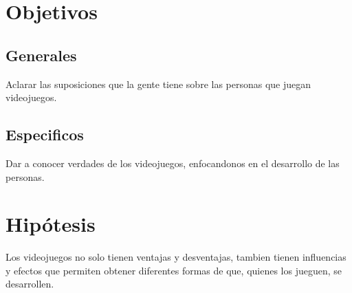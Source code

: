 \documentclass{bmcart}
\begin{document}
\section*{Objetivos}
\subsection*{Generales}
Aclarar las suposiciones que la gente tiene sobre las personas que juegan videojuegos.
\subsection*{Especificos}
Dar a conocer verdades de los videojuegos, enfocandonos en el desarrollo de las personas.

\section*{Hipótesis}
Los videojuegos no solo tienen ventajas y desventajas, tambien tienen influencias y efectos que permiten obtener diferentes formas de que, quienes los jueguen, se desarrollen. %
\end{document}
